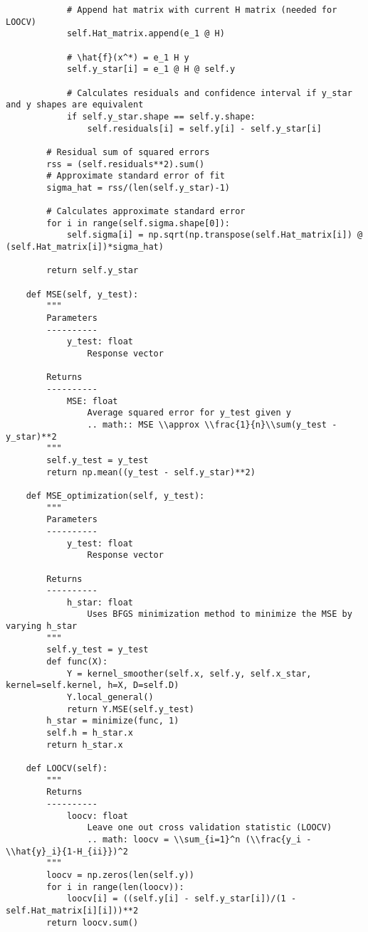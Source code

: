 \documentclass[10pt]{article}
\begin{document}
\begin{lstlisting}
            # Append hat matrix with current H matrix (needed for LOOCV)
            self.Hat_matrix.append(e_1 @ H)

            # \hat{f}(x^*) = e_1 H y
            self.y_star[i] = e_1 @ H @ self.y

            # Calculates residuals and confidence interval if y_star and y shapes are equivalent
            if self.y_star.shape == self.y.shape:
                self.residuals[i] = self.y[i] - self.y_star[i]

        # Residual sum of squared errors
        rss = (self.residuals**2).sum()
        # Approximate standard error of fit
        sigma_hat = rss/(len(self.y_star)-1)

        # Calculates approximate standard error 
        for i in range(self.sigma.shape[0]):
            self.sigma[i] = np.sqrt(np.transpose(self.Hat_matrix[i]) @ (self.Hat_matrix[i])*sigma_hat)

        return self.y_star

    def MSE(self, y_test):
        """
        Parameters
        ----------
            y_test: float
                Response vector

        Returns
        ----------
            MSE: float
                Average squared error for y_test given y
                .. math:: MSE \\approx \\frac{1}{n}\\sum(y_test - y_star)**2
        """
        self.y_test = y_test
        return np.mean((y_test - self.y_star)**2)

    def MSE_optimization(self, y_test):
        """
        Parameters
        ----------
            y_test: float
                Response vector

        Returns
        ----------
            h_star: float
                Uses BFGS minimization method to minimize the MSE by varying h_star
        """
        self.y_test = y_test
        def func(X):
            Y = kernel_smoother(self.x, self.y, self.x_star, kernel=self.kernel, h=X, D=self.D)
            Y.local_general()
            return Y.MSE(self.y_test)
        h_star = minimize(func, 1)
        self.h = h_star.x
        return h_star.x

    def LOOCV(self):
        """
        Returns
        ----------
            loocv: float
                Leave one out cross validation statistic (LOOCV)
                .. math: loocv = \\sum_{i=1}^n (\\frac{y_i - \\hat{y}_i}{1-H_{ii}})^2
        """
        loocv = np.zeros(len(self.y))
        for i in range(len(loocv)):
            loocv[i] = ((self.y[i] - self.y_star[i])/(1 - self.Hat_matrix[i][i]))**2
        return loocv.sum()


\end{lstlisting}
\end{document}
